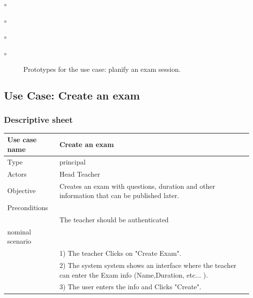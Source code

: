 \documentclass[]{uc2pfecaneva}
\begin{document}
\begin{list}{$\circ$}{}
\begin{list}{$\circ$}{}
\begin{list}{$\circ$}{}
\begin{list}{$\circ$}{}
\begin{figure}[h]
        \caption{Prototypes for the use case: planify an exam session.}
    \end{figure}
    \clearpage








    \raggedright\subsection{Use Case: Create an exam}
    \subsubsection{Descriptive sheet}
    \begin{table}[h]
        \centering
        \begin{tabularx}{\textwidth}{|l|X|}
            \hline
            Use case name         & Create an exam                                                                                              \\ \hline
            Type                  & principal                                                                                                   \\ \hline
            Actors                & Head Teacher                                                                                                \\ \hline
            Objective             & Creates an exam with questions, duration and other information that can be published later.                 \\ \hline
            Preconditions         &                                                                                                             \\
            & The teacher should be authenticated                                                                         \\ \hline
            nominal scenario      &                                                                                                             \\
            & 1) The teacher Clicks on "Create Exam".                                                                     \\
            & 2) The system system shows an interface where the teacher can enter the Exam info (Name,Duration, etc... ). \\
            & 3) The user enters the info and Clicks "Create".                                                            \\

\end{tabularx}
\end{table}
\end{list}
\end{list}
\end{list}
\end{list}
\end{document}

